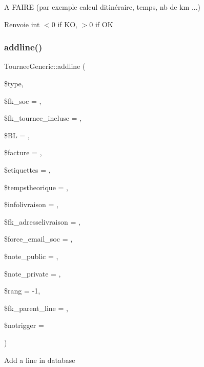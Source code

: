 A F\+A\+I\+RE (par exemple calcul d\textquotesingle{}itinéraire, temps, nb de km ...)

\begin{DoxyReturn}{Renvoie}
int $<$0 if KO, $>$0 if OK 
\end{DoxyReturn}
\mbox{\label{classTourneeGeneric_a677b4ec88b34669b307441d9c068ca1c}} 
\subsubsection{\texorpdfstring{addline()}{addline()}}
{\footnotesize\ttfamily Tournee\+Generic\+::addline (\begin{DoxyParamCaption}\item[{}]{\$type,  }\item[{}]{\$fk\+\_\+soc = {},  }\item[{}]{\$fk\+\_\+tournee\+\_\+incluse = {},  }\item[{}]{\$\+BL = {},  }\item[{}]{\$facture = {},  }\item[{}]{\$etiquettes = {},  }\item[{}]{\$tempstheorique = {},  }\item[{}]{\$infolivraison = {\ttfamily \textquotesingle{}\textquotesingle{}},  }\item[{}]{\$fk\+\_\+adresselivraison = {},  }\item[{}]{\$force\+\_\+email\+\_\+soc = {},  }\item[{}]{\$note\+\_\+public = {\ttfamily \textquotesingle{}\textquotesingle{}},  }\item[{}]{\$note\+\_\+private = {\ttfamily \textquotesingle{}\textquotesingle{}},  }\item[{}]{\$rang = {\ttfamily -\/1},  }\item[{}]{\$fk\+\_\+parent\+\_\+line = {},  }\item[{}]{\$notrigger = {} }\end{DoxyParamCaption})}

Add a line in database


